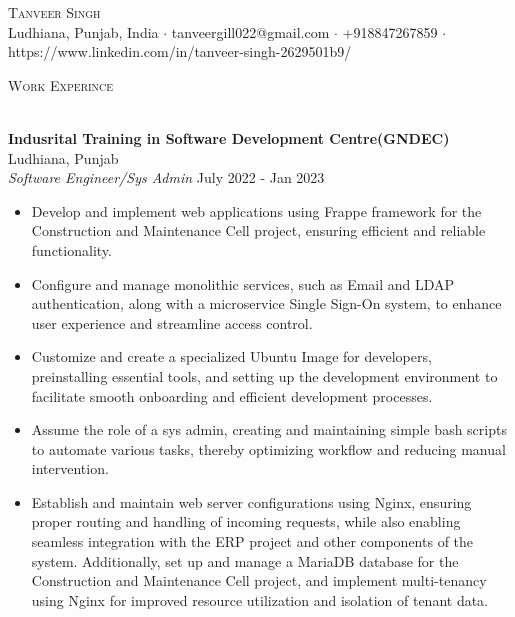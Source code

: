 \documentclass[a4paper]{article}
\newcommand{\lineunder} {
    \vspace*{-8pt} \\
    \hspace*{-18pt} \hrulefill \\
}
\newcommand{\header} [1] {
    {\hspace*{-18pt}\vspace*{6pt} \textsc{#1}}
    \vspace*{-6pt} \lineunder
}
\begin{document}
\vspace*{-40pt}

    

\vspace*{-10pt}
\begin{center}
	{\Huge \scshape {Tanveer Singh}}\\
	Ludhiana, Punjab, India $\cdot$ tanveergill022@gmail.com $\cdot$ +918847267859 $\cdot$ https://www.linkedin.com/in/tanveer-singh-2629501b9/\\
\end{center}

\header{Work Experince}
\vspace{1mm}

\textbf{Indusrital Training in Software Development Centre(GNDEC)} \hfill Ludhiana, Punjab\\
\textit{Software Engineer/Sys Admin} \hfill July 2022 - Jan 2023\\
\vspace{-1mm}
\begin{itemize} \itemsep 1pt
	\item Develop and implement web applications using Frappe framework for the \textquotedbl{}Construction and Maintenance Cell\textquotedbl{} project, ensuring efficient and reliable functionality.
	\item Configure and manage monolithic services, such as Email and LDAP authentication, along with a microservice Single Sign-On system, to enhance user experience and streamline access control.
	\item Customize and create a specialized Ubuntu Image for developers, preinstalling essential tools, and setting up the development environment to facilitate smooth onboarding and efficient development processes.
	\item Assume the role of a sys admin, creating and maintaining simple bash scripts to automate various tasks, thereby optimizing workflow and reducing manual intervention.
	\item Establish and maintain web server configurations using Nginx, ensuring proper routing and handling of incoming requests, while also enabling seamless integration with the ERP project and other components of the system. Additionally, set up and manage a MariaDB database for the \textquotedbl{}Construction and Maintenance Cell\textquotedbl{} project, and implement multi-tenancy using Nginx for improved resource utilization and isolation of tenant data.
\end{itemize}
\end{document}
